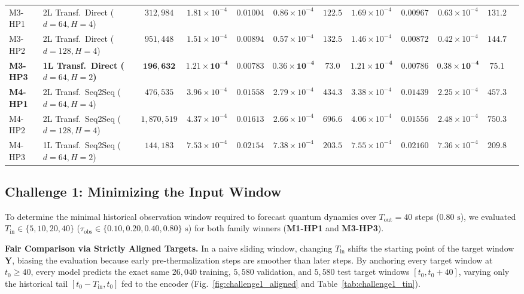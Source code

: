 \documentclass[10pt,a4paper]{article}
\begin{document}
\begin{table}[!htbp]
{\begin{tabular}{llcccccccccc}
        \midrule
        M3-HP1 & 2L Transf.\ Direct ($d=64, H=4$) & $312{,}984$ & $1.81 \times 10^{-4}$ & $0.01004$ & $0.86 \times 10^{-4}$ & $122.5$ & $1.69 \times 10^{-4}$ & $0.00967$ & $0.63 \times 10^{-4}$ & $131.2$ \\
        M3-HP2 & 2L Transf.\ Direct ($d=128, H=4$) & $951{,}448$ & $1.51 \times 10^{-4}$ & $0.00894$ & $0.57 \times 10^{-4}$ & $132.5$ & $1.46 \times 10^{-4}$ & $0.00872$ & $0.42 \times 10^{-4}$ & $144.7$ \\
        \textbf{M3-HP3} & \textbf{1L Transf.\ Direct ($d=64, H=2$)} & $\mathbf{196{,}632}$ & $\mathbf{1.21 \times 10^{-4}}$ & $\mathbf{0.00783}$ & $\mathbf{0.36 \times 10^{-4}}$ & $\mathbf{73.0}$ & $\mathbf{1.21 \times 10^{-4}}$ & $\mathbf{0.00786}$ & $\mathbf{0.38 \times 10^{-4}}$ & $\mathbf{75.1}$ \\
        \midrule
        \textbf{M4-HP1} & 2L Transf.\ Seq2Seq ($d=64, H=4$) & $476{,}535$ & $3.96 \times 10^{-4}$ & $0.01558$ & $2.79 \times 10^{-4}$ & $434.3$ & $3.38 \times 10^{-4}$ & $0.01439$ & $2.25 \times 10^{-4}$ & $457.3$ \\
        M4-HP2 & 2L Transf.\ Seq2Seq ($d=128, H=4$) & $1{,}870{,}519$ & $4.37 \times 10^{-4}$ & $0.01613$ & $2.66 \times 10^{-4}$ & $696.6$ & $4.06 \times 10^{-4}$ & $0.01556$ & $2.48 \times 10^{-4}$ & $750.3$ \\
        M4-HP3 & 1L Transf.\ Seq2Seq ($d=64, H=2$) & $144{,}183$ & $7.53 \times 10^{-4}$ & $0.02154$ & $7.38 \times 10^{-4}$ & $203.5$ & $7.55 \times 10^{-4}$ & $0.02160$ & $7.36 \times 10^{-4}$ & $209.8$ \\
        \bottomrule
    \end{tabular}%
    }
\end{table}

\subsection{Challenge 1: Minimizing the Input Window}
To determine the minimal historical observation window required to forecast quantum dynamics over $T_{\text{out}} = 40$ steps ($0.80\text{ s}$), we evaluated $T_{\text{in}} \in \{5, 10, 20, 40\}$ ($\tau_{\text{obs}} \in \{0.10, 0.20, 0.40, 0.80\}\text{ s}$) for both family winners (\textbf{M1-HP1} and \textbf{M3-HP3}).

\textbf{Fair Comparison via Strictly Aligned Targets.} In a naive sliding window, changing $T_{\text{in}}$ shifts the starting point of the target window $\mathbf{Y}$, biasing the evaluation because early pre-thermalization steps are smoother than later steps. By anchoring every target window at $t_0 \ge 40$, every model predicts the exact same $26{,}040$ training, $5{,}580$ validation, and $5{,}580$ test target windows $[t_0, t_0+40]$, varying only the historical tail $[t_0 - T_{\text{in}}, t_0]$ fed to the encoder (Fig.~\ref{fig:challenge1_aligned} and Table~\ref{tab:challenge1_tin}).
\end{document}
